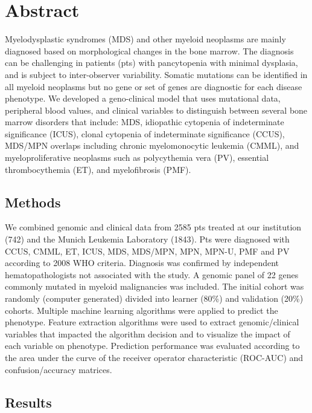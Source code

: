 \section{Abstract}%

Myelodysplastic syndromes (MDS) and other myeloid neoplasms are mainly diagnosed based on morphological changes in the bone marrow. The diagnosis can be challenging in patients (pts) with pancytopenia with minimal dysplasia, and is subject to inter-observer variability. Somatic mutations can be identified in all myeloid neoplasms but no gene or set of genes are diagnostic for each disease phenotype. 
We developed a geno-clinical model that uses mutational data, peripheral blood values, and clinical variables to distinguish between several bone marrow disorders that include: MDS, idiopathic cytopenia of indeterminate significance (ICUS), clonal cytopenia of indeterminate significance (CCUS), MDS/MPN overlaps including chronic myelomonocytic leukemia (CMML), and myeloproliferative neoplasms such as polycythemia vera (PV), essential thrombocythemia (ET), and myelofibrosis (PMF).


\subsection{Methods}%

We combined genomic and clinical data from 2585 pts treated at our institution (742) and the Munich Leukemia Laboratory (1843). Pts were diagnosed with CCUS, CMML, ET, ICUS, MDS, MDS/MPN, MPN, MPN-U, PMF and PV according to 2008 WHO criteria. Diagnosis was confirmed by independent hematopathologists not associated with the study. A genomic panel of 22 genes commonly mutated in myeloid malignancies was included. The initial cohort was randomly (computer generated) divided into learner (80\%) and validation (20\%) cohorts. Multiple machine learning algorithms were applied to predict the phenotype. Feature extraction algorithms were used to extract genomic/clinical variables that impacted the algorithm decision and to visualize the impact of each variable on phenotype. Prediction performance was evaluated according to the area under the curve of the receiver operator characteristic (ROC-AUC) and confusion/accuracy matrices.


\subsection{Results}%

